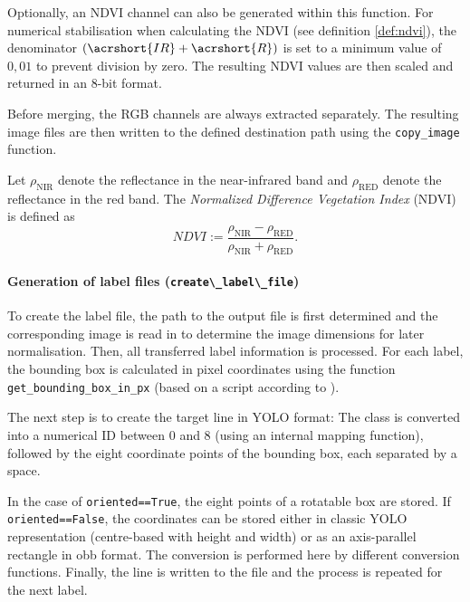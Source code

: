 Optionally, an \acrshort{NDVI} channel can also be generated within this function. For numerical stabilisation when calculating the \acrshort{NDVI} (see definition \ref{def:ndvi}), the denominator $(\acrshort{IR} + \acrshort{R})$ is set to a minimum value of $0{,}01$ to prevent division by zero. The resulting \acrshort{NDVI} values are then scaled and returned in an 8-bit format.

Before merging, the \acrshort{RGB} channels are always extracted separately. The resulting image files are then written to the defined destination path using the \lstinline|copy_image| function.



\begin{definition}
Let $\rho_{\text{NIR}}$ denote the reflectance in the near-infrared band and 
$\rho_{\text{RED}}$ denote the reflectance in the red band. 
The \textit{Normalized Difference Vegetation Index} (NDVI) is defined as
\begin{equation}
NDVI := \frac{\rho_{\text{NIR}} - \rho_{\text{RED}}}{\rho_{\text{NIR}} + \rho_{\text{RED}}}.
\end{equation}
\label{def:ndvi}
\end{definition}



\paragraph{Generation of label files (\lstinline|create\_label\_file|)}
\hypertarget{par:create_label_file}{}

To create the label file, the path to the output file is first determined and the corresponding image is read in to determine the image dimensions for later normalisation. Then, all transferred label information is processed. For each label, the bounding box is calculated in pixel coordinates using the function \lstinline|get_bounding_box_in_px| (based on a script according to \citeauthor{Razakarivony2015} \cite{Razakarivony2015}).

The next step is to create the target line in \acrshort{YOLO} format: The class is converted into a numerical \acrshort{ID} between 0 and 8 (using an internal mapping function), followed by the eight coordinate points of the bounding box, each separated by a space.

In the case of \lstinline|oriented==True|, the eight points of a rotatable box are stored. If \lstinline|oriented==False|, the coordinates can be stored either in classic \acrshort{YOLO} representation (centre-based with height and width) or as an axis-parallel rectangle in \acrshort{obb} format. The conversion is performed here by different conversion functions. Finally, the line is written to the file and the process is repeated for the next label.

